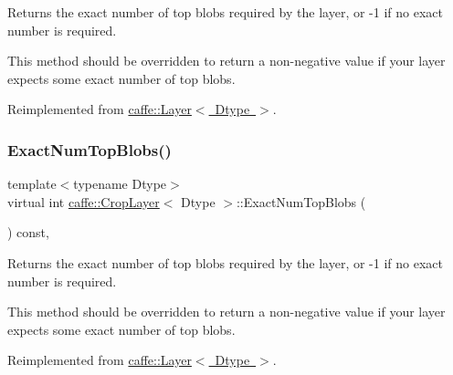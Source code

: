 Returns the exact number of top blobs required by the layer, or -\/1 if no exact number is required. 

This method should be overridden to return a non-\/negative value if your layer expects some exact number of top blobs. 

Reimplemented from \mbox{\hyperlink{classcaffe_1_1_layer_a64e2ca72c719e4b2f1f9216ccfb0d37f}{caffe\+::\+Layer$<$ Dtype $>$}}.

\mbox{\label{classcaffe_1_1_crop_layer_a7e4a9aa634577308bc189adcf0ac22ed}} 
\subsubsection{\texorpdfstring{Exact\+Num\+Top\+Blobs()}{ExactNumTopBlobs()}\hspace{0.1cm}{\footnotesize\ttfamily [2/2]}}
{\footnotesize\ttfamily template$<$typename Dtype$>$ \\
virtual int \mbox{\hyperlink{classcaffe_1_1_crop_layer}{caffe\+::\+Crop\+Layer}}$<$ Dtype $>$\+::Exact\+Num\+Top\+Blobs (\begin{DoxyParamCaption}{ }\end{DoxyParamCaption}) const\hspace{0.3cm}{\ttfamily [inline]}, {\ttfamily [virtual]}}



Returns the exact number of top blobs required by the layer, or -\/1 if no exact number is required. 

This method should be overridden to return a non-\/negative value if your layer expects some exact number of top blobs. 

Reimplemented from \mbox{\hyperlink{classcaffe_1_1_layer_a64e2ca72c719e4b2f1f9216ccfb0d37f}{caffe\+::\+Layer$<$ Dtype $>$}}.

\mbox{\label{classcaffe_1_1_crop_layer_a59dcb04b78d55f666b69ff001c90caa7}} 
